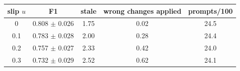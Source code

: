 \begin{tabular}{ccccc}
\toprule
slip $u$ & F1 & stale & wrong changes applied & prompts/100 \\
\midrule
0 & 0.808 $\pm$ 0.026 & 1.75 & 0.02 & 24.5 \\
0.1 & 0.783 $\pm$ 0.028 & 2.00 & 0.28 & 24.4 \\
0.2 & 0.757 $\pm$ 0.027 & 2.33 & 0.42 & 24.0 \\
0.3 & 0.732 $\pm$ 0.029 & 2.52 & 0.62 & 24.1 \\
\bottomrule
\end{tabular}
